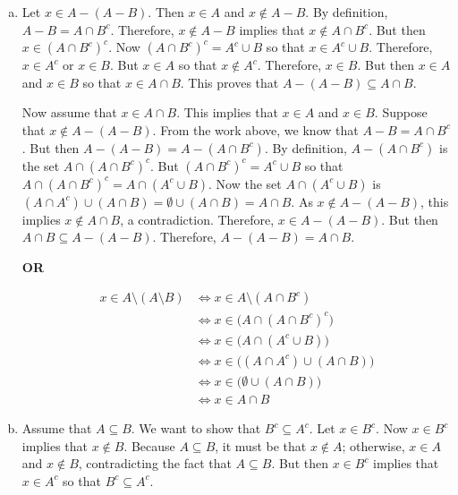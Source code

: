 \documentclass[11pt,letterpaper]{article}
\begin{document}
\sol
\begin{enumerate}[(a)]
\item Let $x \in A - (A - B)$. Then $x \in A$ and $x \notin A - B$. By definition, $A - B= A \cap B^c$. Therefore, $x \notin A - B$ implies that $x \notin A \cap B^c$. But then $x \in (A \cap B^c)^c$. Now $(A \cap B^c)^c= A^c \cup B$ so that $x \in A^c \cup B$. Therefore, $x \in A^c$ or $x \in B$. But $x \in A$ so that $x \notin A^c$. Therefore, $x \in B$. But then $x \in A$ and $x \in B$ so that $x \in A \cap B$. This proves that $A - (A - B) \subseteq A \cap B$. 

Now assume that $x \in A \cap B$. This implies that $x \in A$ and $x \in B$. Suppose that $x \notin A - (A - B)$. From the work above, we know that $A - B= A \cap B^c$. But then $A - (A - B)= A - (A \cap B^c)$. By definition, $A - (A \cap B^c)$ is the set $A \cap (A \cap B^c)^c$. But $(A \cap B^c)^c= A^c \cup B$ so that $A \cap (A \cap B^c)^c= A \cap (A^c \cup B)$. Now the set $A \cap (A^c \cup B)$ is $(A \cap A^c) \cup (A \cap B)= \emptyset \cup (A \cap B)= A \cap B$. As $x \notin A - (A - B)$, this implies $x \notin A \cap B$, a contradiction. Therefore, $x \in A - (A - B)$. But then $A \cap B \subseteq A - (A - B)$. Therefore, $A - (A - B)= A \cap B$. 

\begin{center} {\bfseries OR} \end{center}

	\[
	\begin{aligned}
	x \in A \setminus (A \setminus B)&\Longleftrightarrow x \in A \setminus (A \cap B^c) \\
	&\Longleftrightarrow x \in \big( A \cap (A \cap B^c)^c \big) \\
	&\Longleftrightarrow x \in \big( A \cap (A^c \cup B) \big) \\
	&\Longleftrightarrow x \in \big( (A \cap A^c) \cup (A \cap B) \big) \\
	&\Longleftrightarrow x \in \big( \emptyset \cup (A \cap B) \big) \\
	&\Longleftrightarrow x \in A \cap B
	\end{aligned}
	\]

\item  Assume that $A \subseteq B$. We want to show that $B^c \subseteq A^c$. Let $x \in B^c$. Now $x \in B^c$ implies that $x \notin B$. Because $A \subseteq B$, it must be that $x \notin A$; otherwise, $x \in A$ and $x \notin B$, contradicting the fact that $A \subseteq B$. But then $x \in B^c$ implies that $x \in A^c$ so that $B^c \subseteq A^c$. 


\end{enumerate}
\end{document}
